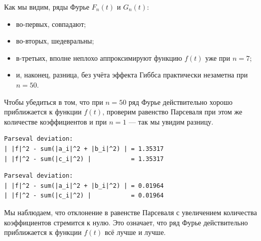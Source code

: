 \documentclass[a4paper]{article}
\begin{document}
Как мы видим, ряды Фурье $F_n(t)$ и $G_n(t)$:
\begin{itemize}
    \item во-первых, совпадают;
    \item во-вторых, шедевральны;
    \item в-третьих, вполне неплохо аппроксимируют функцию $f(t)$ уже при $n = 7$;
    \item и, наконец, разница, без учёта эффекта Гиббса практически незаметна при $n = 50$.
\end{itemize}
Чтобы убедиться в том, что при $n = 50$ ряд Фурье действительно хорошо приближается к функции $f(t)$, проверим равенство Парсеваля при этом же количестве коэффициентов и при $n = 1$ --- так мы увидим разницу.
\begin{minipage}{0.48\textwidth}
\begin{lstlisting}[caption={Равенство Парасеваля при $n=1$}]
Parseval deviation:
| |f|^2 - sum(|a_i|^2 + |b_i|^2) | = 1.35317
| |f|^2 - sum(|c_i|^2) |           = 1.35317
\end{lstlisting}
\end{minipage}\hfill
\begin{minipage}{0.49\textwidth}
\begin{lstlisting}[caption={Равенство Парасеваля при $n=50$}, numbers=none]
Parseval deviation:
| |f|^2 - sum(|a_i|^2 + |b_i|^2) | = 0.01964
| |f|^2 - sum(|c_i|^2) |           = 0.01964
\end{lstlisting}
\end{minipage}
Мы наблюдаем, что отклонение в равенстве Парсеваля с увеличением количества коэффициентов стремится к нулю. Это означает, что ряд Фурье действительно приближается к функции $f(t)$ всё лучше и лучше.\\[0.5em]
\end{document}
